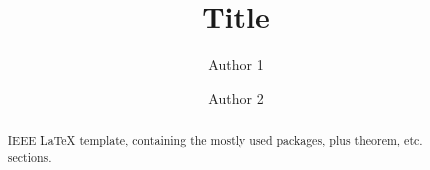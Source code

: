 \documentclass[conference]{IEEEtran}
\begin{document}
\title{\huge Title}


\author{Author 1}
\author{Author 2}

\maketitle


\begin{abstract}

IEEE LaTeX template, containing the mostly used packages, plus theorem, etc. sections.

\end{abstract}
\IEEEpeerreviewmaketitle







\end{document}
